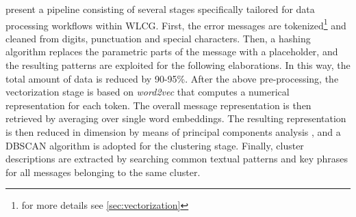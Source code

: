  present a pipeline consisting of several stages specifically tailored for data processing workflows within WLCG. 
First, the error messages are tokenized\footnote{\label{note1}for more details see \cref{sec:vectorization}} and cleaned from digits, punctuation and special characters.
Then, a hashing algorithm replaces the parametric parts of the message with a placeholder, and the resulting patterns are exploited for the following elaborations. In this way, the total amount of data is reduced by 90-95\%.
After the above pre-processing, the vectorization stage is based on \textit{word2vec} \cite{mikolov2013word2vec} that computes a numerical representation for each token. The overall message representation is then retrieved by averaging over single word embeddings.
The resulting representation is then reduced in dimension by means of principal components analysis \cite{wold1987pca}, and a DBSCAN \cite{ester1996dbscan} algorithm is adopted for the clustering stage.
Finally, cluster descriptions are extracted by searching common textual patterns and key phrases for all messages belonging to the same cluster.


